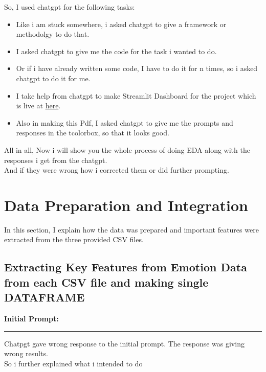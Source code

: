 \documentclass[11pt,a4paper]{article}
\begin{document}
So, I used chatgpt for the following tasks:
\begin{itemize}
    \item Like i am stuck somewhere, i asked chatgpt to give a framework or methodolgy to do that.
    \item I asked chatgpt to give me the code for the task i wanted to do.
    \item Or if i have already written some code, I have to do it for n times, so i asked chatgpt to do it for me.
    \item I take help from chatgpt to make Streamlit Dashboard for the project which is live at \href{https://eda-analysis-iby-0.streamlit.app/}{here}.
    \item Also in making this Pdf, I asked chatgpt to give me the prompts and responses in the tcolorbox, so that it looks good. 
\end{itemize}

All in all, Now i will show you the whole process of doing EDA along with the responses i get from the chatgpt.\\
And if they were wrong how i corrected them or did further prompting.\\

\normalsize
\newpage
\section{Data Preparation and Integration}
\label{sec:data-prep}

In this section, I explain how the data was prepared and important features were extracted from the three provided CSV files.

\subsection{Extracting Key Features from Emotion Data from each CSV file and making single DATAFRAME}
\textbf{Initial Prompt:}
\begin{tcolorbox}[breakable, colback=gray!5, colframe=gray!50!black,title= Prompt]

\end{tcolorbox}
\begin{center}
    \color{red}\rule{1\linewidth}{0.5mm}
\end{center}


\begin{responsebox}
    Chatpgt gave wrong response to the initial prompt. The response was giving wrong results.\\
    So i further explained what i intended to do
\end{responsebox}
   
\end{document}
